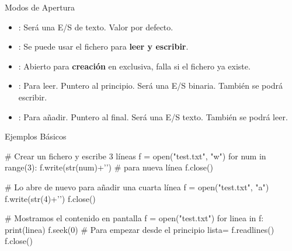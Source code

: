 \documentclass[10pt, envcountsect , spanish]{beamer}
\begin{document}
\begin{frame}{Modos de Apertura}
\begin{itemize}
\item {}: Será una E/S de texto. Valor por defecto.

\item \key{+}:  Se puede usar el fichero para \textbf{leer y escribir}.

\item {}:  Abierto para \textbf{creación} en exclusiva, falla si el fichero ya existe.
\end{itemize}

\hskip-0.5cm\unEjemplo

\begin{itemize}
\item {}: Para leer. Puntero al principio. Será una E/S binaria. También se podrá escribir.
\item {}: Para añadir. Puntero al final. Será una E/S texto. También se podrá leer.
\end{itemize}

\end{frame}




\begin{frame}[fragile]{Ejemplos Básicos} 

\begin{pyverbatim}[][frame=single]%

# Crear un fichero y escribe 3 líneas
f = open("test.txt", "w")
for num in range(3):
  f.write(str(num)+'\n') # \n para nueva línea
f.close()

# Lo abre de nuevo para añadir una cuarta línea
f = open("test.txt", "a")
f.write(str(4)+'\n')
f.close()

# Mostramos el contenido en pantalla
f = open("test.txt")
for linea in f:
  print(linea)
f.seek(0)  # Para empezar desde el principio
lista= f.readlines()
f.close()
\end{pyverbatim}

\end{frame}
\end{document}
